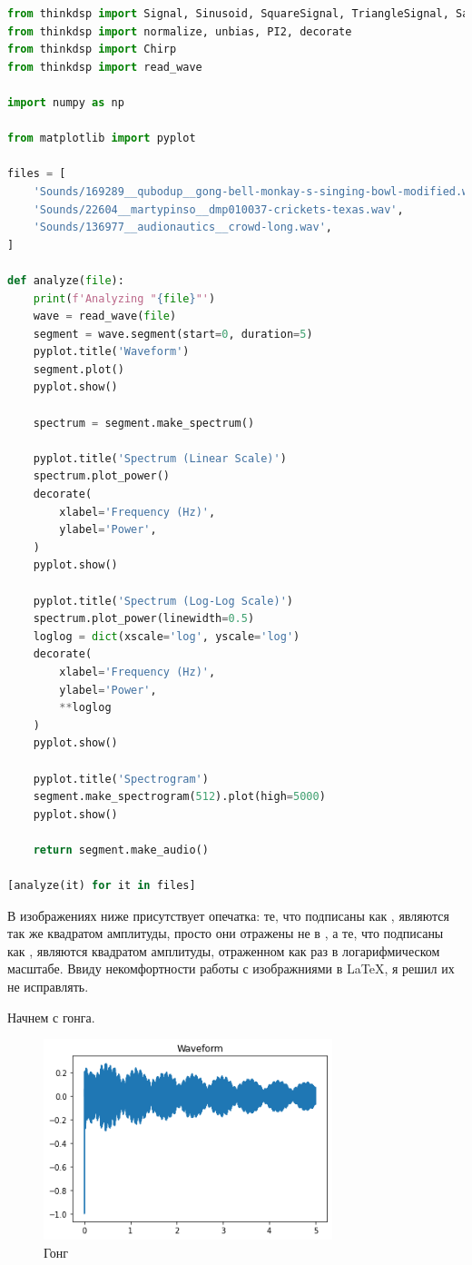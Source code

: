 \documentclass[a4paper,12pt]{report}
\begin{document}
\begin{lstlisting}[language=Python,caption=Анализ файлов]
from thinkdsp import Signal, Sinusoid, SquareSignal, TriangleSignal, SawtoothSignal, ParabolicSignal
from thinkdsp import normalize, unbias, PI2, decorate
from thinkdsp import Chirp
from thinkdsp import read_wave

import numpy as np

from matplotlib import pyplot

files = [
    'Sounds/169289__qubodup__gong-bell-monkay-s-singing-bowl-modified.wav',
    'Sounds/22604__martypinso__dmp010037-crickets-texas.wav',
    'Sounds/136977__audionautics__crowd-long.wav',
]

def analyze(file):
    print(f'Analyzing "{file}"')
    wave = read_wave(file)
    segment = wave.segment(start=0, duration=5)
    pyplot.title('Waveform')
    segment.plot()
    pyplot.show()

    spectrum = segment.make_spectrum()
    
    pyplot.title('Spectrum (Linear Scale)')
    spectrum.plot_power()
    decorate(
        xlabel='Frequency (Hz)',
        ylabel='Power',
    )
    pyplot.show()
    
    pyplot.title('Spectrum (Log-Log Scale)')
    spectrum.plot_power(linewidth=0.5)
    loglog = dict(xscale='log', yscale='log')
    decorate(
        xlabel='Frequency (Hz)',
        ylabel='Power',
        **loglog
    )
    pyplot.show()
    
    pyplot.title('Spectrogram')
    segment.make_spectrogram(512).plot(high=5000)
    pyplot.show()
    
    return segment.make_audio()

[analyze(it) for it in files]
\end{lstlisting}

    В изображениях ниже присутствует опечатка: те, что подписаны как , являются так же квадратом амплитуды, просто они отражены не в , а те, что подписаны как , являются квадратом амплитуды, отраженном как раз в логарифмическом масштабе. Ввиду некомфортности работы с изображниями в \LaTeX, я решил их не исправлять.

    Начнем с гонга.

    \begin{figure}[H]
        \centering
        \includegraphics[width=0.75\textwidth]{ex1_gong_wave.png}
        \caption{Гонг}
        \label{fig:ex1_gong_wave}
    \end{figure}
    
\end{document}
